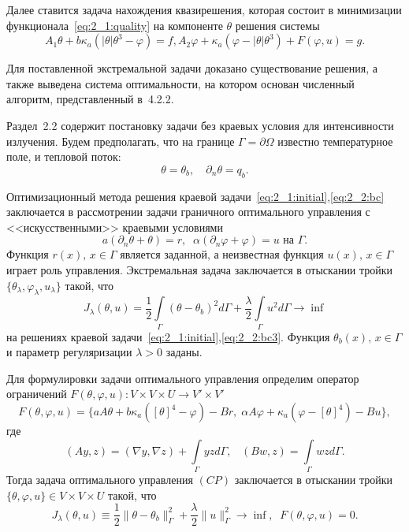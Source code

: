 Далее ставится задача нахождения квазирешения, которая состоит в минимизации
функционала~\eqref{eq:2_1:quality} на компоненте $\theta$ решения системы
\begin{equation}
    \label{eq:2_1:weakOperational}
    A_1 \theta + b \kappa_a (| \theta | \theta^3 - \varphi ) =
    f, A_2 \varphi + \kappa_a (\varphi - |\theta|\theta^3) + F(\varphi, u) = g.
\end{equation}


Для поставленной экстремальной задачи доказано существование решения,
а также выведена система оптимальности, на котором
основан численный алгоритм, представленный в~4.2.2.


Раздел~2.2 содержит постановку задачи без краевых условия для интенсивности излучения.
Будем предполагать, что на границе $\Gamma = \partial \Omega$ известно температурное поле, и тепловой поток:
\begin{equation}
    \label{eq:2_2:bc} \theta = \theta_b, \quad \partial_n\theta = q_b.
\end{equation}

Оптимизационный метода решения краевой задачи~\eqref{eq:2_1:initial},\eqref{eq:2_2:bc}
заключается в рассмотрении задачи граничного
оптимального управления с <<искусственными>> краевыми условиями
\begin{equation}
    \label{eq:2_2:bc3}
    a(\partial_n\theta+\theta) = r,\;\;
    \alpha(\partial_n\varphi+\varphi) = u \text{ на }\Gamma.
\end{equation}
Функция $r(x),\, x\in\Gamma$ является заданной, а неизвестная функция $u(x),\, x\in\Gamma$
играет роль управления.
Экстремальная задача заключается в отыскании тройки
$\{\theta_\lambda,\varphi_\lambda,u_\lambda\}$ такой, что
\begin{equation}
    \label{eq:2_2:cost}
    J_\lambda(\theta, u) = \frac{1}{2}\int\limits_\Gamma (\theta - \theta_b)^2 d\Gamma
    + \frac{\lambda}{2}\int\limits_\Gamma u^2 d\Gamma \rightarrow\inf
\end{equation}
на решениях краевой задачи~\eqref{eq:2_1:initial},\eqref{eq:2_2:bc3}.
Функция $\theta_b(x),\, x\in\Gamma$  и параметр регуляризации $\lambda>0$ заданы.

Для формулировки задачи оптимального управления определим оператор
ограничений $F(\theta, \varphi, u) : V \times V \times U \rightarrow V' \times V'$
\[
    F(\theta, \varphi, u) = \{ aA\theta + b \kappa_a ( [\theta]^4- \varphi) - Br,\;
    \alpha A \varphi + \kappa_a (\varphi -[\theta]^4) - Bu\},
\]
где
\[
    (Ay,z) = (\nabla y, \nabla z) +
    \int\limits_{\Gamma}yz d\Gamma, \;\;\; (Bw, z)
    = \int\limits_{\Gamma}wz d\Gamma.
\]
Тогда задача оптимального управления $(CP)$ заключается в отыскании тройки
$\{\theta, \varphi, u \} \in V \times V \times U$
такой, что
\begin{equation}
    \label{eq:2_2:cp}
    J_\lambda(\theta, u) \equiv \frac{1}{2}\|\theta -\theta_b\|^2_\Gamma
    + \frac{\lambda}{2}\|u\|^2_\Gamma \rightarrow \inf,\;\; F(\theta, \varphi, u)=0.
\end{equation}


